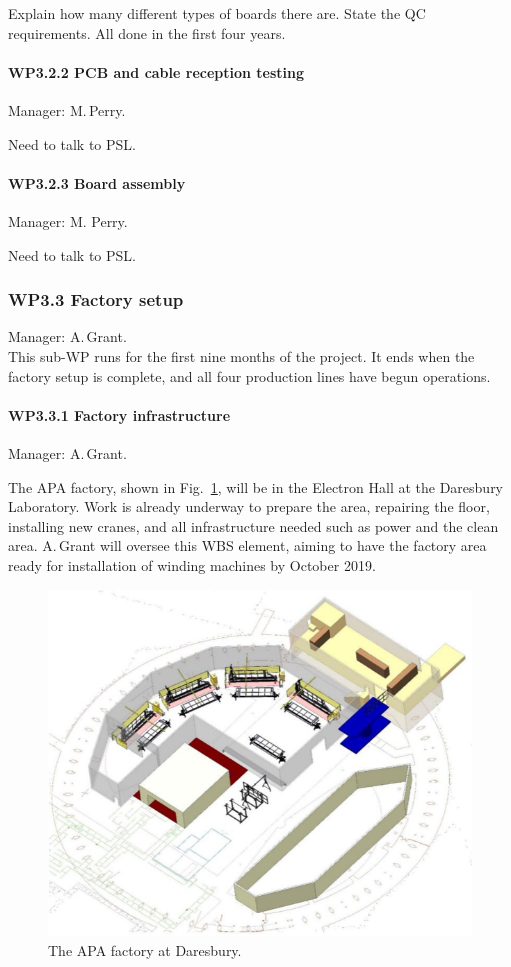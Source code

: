 Explain how many different types of boards there are.
State the QC requirements.
All done in the first four years.

\paragraph{WP3.2.2 PCB and cable reception testing}

Manager: M.\,Perry.

Need to talk to PSL.

\paragraph{WP3.2.3 Board assembly}

Manager: M. Perry.

Need to talk to PSL.

\subsubsection{WP3.3 Factory setup}
Manager: A.\,Grant.\\
This sub-WP runs for the first nine months of the project. It ends when the factory setup is complete, and all four production lines have begun operations.

\paragraph{WP3.3.1 Factory infrastructure} Manager: A.\,Grant.

The APA factory, shown in Fig.~\ref{fig:APAFactory}, will be in the Electron Hall at the Daresbury Laboratory. Work is already underway to prepare the area, repairing the floor, installing new cranes, and all infrastructure needed such as power and the clean area. A.\,Grant will oversee this WBS element, aiming to have the factory area ready for installation of winding machines by October 2019.

\begin{figure}
    \centering
    \includegraphics{figs/WP3/FactoryLayout.png}
    \caption{The APA factory at Daresbury.}
    \label{fig:APAFactory}
\end{figure}

